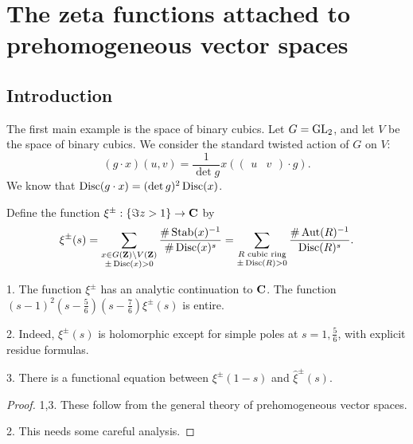 
\section{The zeta functions attached to prehomogeneous vector spaces}\label{sec:taniguchi}





\subsection{Introduction}

The first main example is the space of binary cubics. Let $G=\operatorname{GL}_2$, 
and let $V$ be the space of binary cubics. We consider the standard twisted 
action of $G$ on $V$: 
\[
  (g\cdot x)(u,v) = \frac{1}{\det g} x\left(\begin{pmatrix} u & v \end{pmatrix} \cdot g\right) .
\]
We know that $\operatorname{Disc}(g\cdot x) = (\det g)^2 \operatorname{Disc}(x)$. 

\begin{defi}[Shintani]
Define the function $\xi^\pm:\{\Im z>1\} \to \mathbf{C}$ by 
\[
  \xi^\pm(s) 
    = \sum_{\substack{x\in G(\mathbf{Z})\backslash V(\mathbf{Z}) \\ \pm \operatorname{Disc}(x)>0}} \frac{\# \operatorname{Stab}(x)^{-1}}{\# \operatorname{Disc}(x)^s} = \sum_{\substack{R\text{ cubic ring} \\ \pm \operatorname{Disc}(R)>0}} \frac{\# \operatorname{Aut}(R)^{-1}}{\operatorname{Disc}(R)^s} .
\]
\end{defi}

\begin{theo}
1. The function $\xi^\pm$ has an analytic continuation to $\mathbf{C}$. The %
function $(s-1)^2 (s-\frac 5 6)(s-\frac 7 6)\xi^\pm(s)$ is entire. 

2. Indeed, $\xi^\pm(s)$ is holomorphic except for simple poles %
at $s=1,\frac 5 6$, with explicit residue formulas. 

3. There is a functional equation between $\xi^\pm(1-s)$ and %
$\widehat\xi^\pm(s)$. 
\end{theo}
\begin{proof}
1,3. These follow from the general theory of prehomogeneous vector spaces. 

2. This needs some careful analysis. 
\end{proof}

